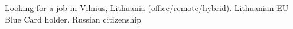 \documentclass[letter,10pt]{article}
\begin{document}
Looking for a job in Vilnius, Lithuania (office/remote/hybrid). Lithuanian EU Blue Card holder. Russian citizenship\\
\end{document}
